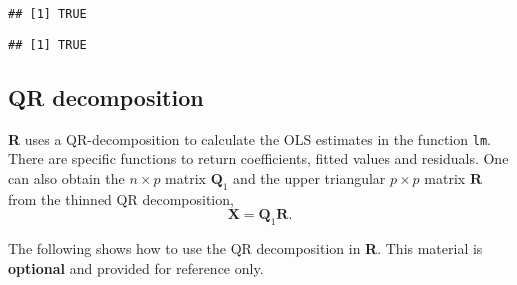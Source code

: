 \documentclass[]{book}
\newenvironment{Shaded}{\begin{snugshade}}{\end{snugshade}}
\newcommand{\CommentTok}[1]{\textcolor[rgb]{0.56,0.35,0.01}{\textit{#1}}}
\newcommand{\DataTypeTok}[1]{\textcolor[rgb]{0.13,0.29,0.53}{#1}}
\newcommand{\DecValTok}[1]{\textcolor[rgb]{0.00,0.00,0.81}{#1}}
\newcommand{\KeywordTok}[1]{\textcolor[rgb]{0.13,0.29,0.53}{\textbf{#1}}}
\newcommand{\NormalTok}[1]{#1}
\newcommand{\OperatorTok}[1]{\textcolor[rgb]{0.81,0.36,0.00}{\textbf{#1}}}
\newcommand{\OtherTok}[1]{\textcolor[rgb]{0.56,0.35,0.01}{#1}}
\newcommand{\StringTok}[1]{\textcolor[rgb]{0.31,0.60,0.02}{#1}}
\theoremstyle{definition}
\theoremstyle{definition}
\theoremstyle{definition}
\theoremstyle{remark}
\begin{document}
\begin{verbatim}
## [1] TRUE
\end{verbatim}

\begin{Shaded}
\end{Shaded}

\begin{verbatim}
## [1] TRUE
\end{verbatim}

\hypertarget{qr-decomposition}{%
\subsection{QR decomposition}\label{qr-decomposition}}

\textbf{R} uses a QR-decomposition to calculate the OLS estimates in the function \texttt{lm}. There are specific functions to return coefficients, fitted values and residuals. One can also obtain the \(n \times p\) matrix \(\mathbf{Q}_1\) and the upper triangular \(p \times p\) matrix \(\mathbf{R}\) from the thinned QR decomposition,
\[\mathbf{X} = \mathbf{Q}_1\mathbf{R}.\]

The following shows how to use the QR decomposition in \textbf{R}. This material is \textbf{optional} and provided for reference only.

\begin{Shaded}
\end{Shaded}
\end{document}
